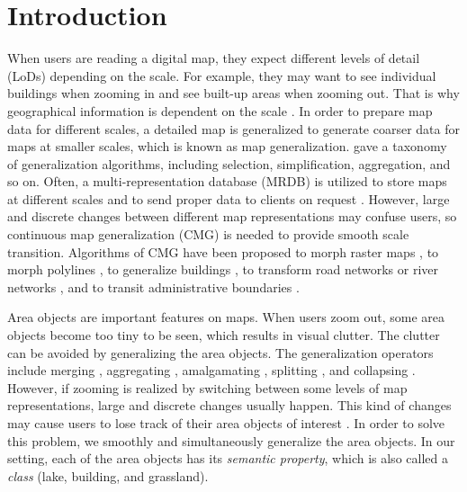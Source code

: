 \documentclass[twocolumn]{svjour3}          %
\begin{document}
\section{Introduction}
\label{sec:introduction}



When users are reading a digital map,
they expect different levels of detail (LoDs) depending on the scale.
For example, they may want to see individual buildings when zooming in
and see built-up areas when zooming out.
That is why geographical information is dependent on the scale
\citep{Muller1995Generalization,Weibel1997}. 
In order to prepare map data for different scales,
a detailed map is generalized to generate coarser data 
for maps at smaller scales,
which is known as map generalization.
\citet{Mackaness2017Generalization} gave a taxonomy of 
generalization algorithms, 
including selection, simplification, aggregation, and so on.
Often, a multi-representation database (MRDB) is utilized to store
maps at different scales and to send proper data to clients on request
\citep[\eg][]{Hampe2004multiple}.
However, large and discrete changes between different map representations
may confuse users,
so continuous map generalization (CMG) is needed to
provide smooth scale transition.
Algorithms of CMG have been proposed 
to morph raster maps
\citep[\eg][]{Pantazis2009a,Pantazis2009b}, 
to morph polylines
\citep[\eg][]{Noellenburg2008,Peng2013LSA,Deng2015,Li2017Annealing,Li2018Fourier},
to generalize buildings
\citep[\eg][]{Li2017_Building,Peng2017Building,Touya2017Progressive},
to transform road networks or river networks
\citep[\eg][]{Suba2016Road,Chimani2014Eat,Huang2017Matrix,Peng2012River},
and to transit administrative boundaries
\citep[\eg][]{Peng2016Admin}.






Area objects are important features on maps. 
When users zoom out,
some area objects become too tiny to be seen,
which results in visual clutter.
The clutter can be avoided by generalizing the 
area objects.
The generalization operators include
merging \citep[\eg][]{HaunertWolff2010AreaAgg}, 
aggregating \citep[\eg][]{Shen2019Aggregation}, 
amalgamating \citep[\eg][]{Regnauld2007Amalgamation}, 
splitting \citep[\eg][]{Meijers2016Split}, 
and collapsing \citep[\eg][]{Haunert2008Skeleton}.
However, if zooming is realized by switching between
some levels of map representations, 
large and discrete changes usually happen.
This kind of changes may cause users to lose track of
their area objects of interest \citep{vanKreveld2001}.
In order to solve this problem, 
we smoothly and simultaneously generalize the area objects.
In our setting, each of the area objects has its \emph{semantic property},
which is also called a \emph{class} (\eg lake, building, and grassland).
\end{document}
